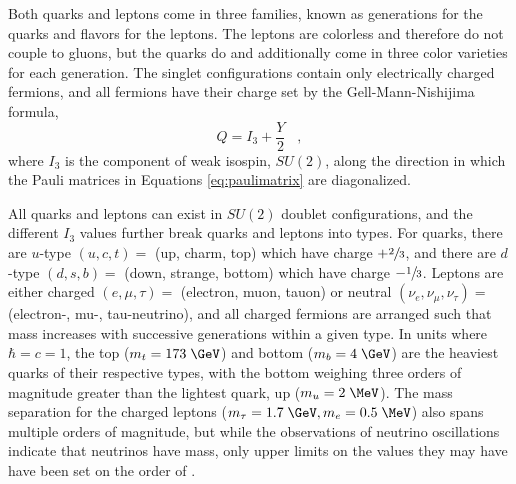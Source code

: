  Both quarks and leptons come in three
  families, known as generations for the 
  quarks and flavors for the leptons.
 The leptons are colorless and therefore
  do not couple to gluons, but the 
  quarks do and additionally 
  come in three color varieties
  for each generation. %
 The singlet configurations contain only electrically charged
  fermions, and all fermions have their charge set
  by the Gell-Mann-Nishijima formula,
\begin{equation} \label{eq:gmnformula}
 Q=I_3+\frac{Y}{2}\;\;\;,
\end{equation}
  where $I_3$ is the component of weak isospin, $SU(2)$,
  along the direction in which the 
  Pauli matrices in Equations \ref{eq:paulimatrix} are 
  diagonalized.


 All quarks and leptons can exist in $SU(2)$
  doublet configurations, and the different $I_3$ 
  values further break quarks and leptons into types.
 For quarks, there are $u$-type {$(u,c,t)=$ (up, charm, top)} which have charge $+\sfrac{2}{3}$,
  and there are $d$-type {$(d,s,b)=$ (down, strange, bottom)} which have charge $-\sfrac{1}{3}$.
 Leptons are either charged {$(e,\mu,\tau)=$ (electron, muon, tauon)}
  or neutral {$(\nu_e,\nu_\mu,\nu_\tau)=$ (electron-, mu-, tau-neutrino)},
  and all charged fermions are arranged such that mass
  increases with successive generations within a given type. 
 In units where $\hbar=c=1$, the top ($m_t=173 \;\GeV$)
  and bottom ($m_b=4 \;\GeV$) are the heaviest quarks
  of their respective types, with the bottom 
  weighing three orders of magnitude greater than 
  the lightest quark, up ($m_u=2 \;\MeV$).
 The mass separation for the charged leptons
  ($m_\tau=1.7 \;\GeV, m_e=0.5 \;\MeV$)
  also spans multiple orders of magnitude,
  but while the observations of neutrino oscillations
  indicate that neutrinos have mass, 
  only upper limits on the values they may have
  have been set on the order of \MeV. 

